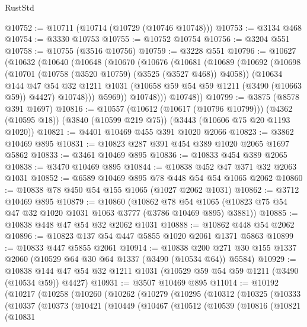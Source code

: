 \begin{lexlean}{RustStd}
\begin{coremodule}
@10752 := @10711 (@10714 (@10729 (@10746 @10748)))
@10753 := @3134 @468
@10754 := @3330 @10753
@10755 := @10752 @10754
@10756 := @3204 @551
@10758 := @10755 (@3516 @10756)
@10759 := @3228 @551
@10796 := @10627
    (@10632
      (@10640
        (@10648
          (@10670
            (@10676
              (@10681
                (@10689
                  (@10692
                    (@10698
                      (@10701 (@10758 (@3520 @10759) (@3525 (@3527 @468)) @4058))
                      (@10634
                        @144
                        @47
                        @54
                        @32
                        @1211
                        @1031
                        (@10658 @59 @54 @59 @1211 (@3490 (@10663 @59)) @4427)
                        @10748)))
                  @5969))
              @10748)))
        @10748))
@10799 := @3875 (@8578 @391 @1697)
@10816 := @10557
    (@10612 (@10617 (@10796 @10799)))
    (@4362 (@10595 @18))
    (@3840 (@10599 @219 @75))
    (@3443 (@10606 @75 @20 @1193 @1020))
@10821 := @4401 @10469 @455 @391 @1020 @2066
@10823 := @3862 @10469 @895
@10831 := @10823 @287 @391 @454 @389 @1020 @2065 @1697 @5862
@10833 := @3461 @10469 @895
@10836 := @10833 @454 @389 @2065
@10838 := @3470 @10469 @895
@10844 := @10838 @452 @47 @371 @32 @2063 @1031
@10852 := @6589 @10469 @895 @78 @448 @54 @54 @1065 @2062
@10860 := @10838 @78 @450 @54 @155 @1065 (@1027 @2062 @1031)
@10862 := @3712 @10469 @895
@10879 := @10860
    (@10862
      @78
      @54
      @1065
      (@10823 @75 @54 @47 @32 @1020 @1031 @1063 @3777 (@3786 @10469 @895) @3881))
@10885 := @10838 @448 @47 @54 @32 @2062 @1031
@10888 := @10862 @448 @54 @2062
@10896 := @10823 @137 @54 @447 @5855 @1020 @2061 @1371 @5863
@10899 := @10833 @447 @5855 @2061
@10914 := @10838
    @200
    @271
    @30
    @155
    @1337
    @2060
    (@10529 @64 @30 @64 @1337 (@3490 (@10534 @64)) @5584)
@10929 := @10838 @144 @47 @54 @32 @1211 @1031 (@10529 @59 @54 @59 @1211 (@3490 (@10534 @59)) @4427)
@10931 := @3507 @10469 @895
@11014 := @10192
    (@10217
      (@10258
        (@10260
          (@10262
            (@10279
              (@10295
                (@10312
                  (@10325
                    (@10333
                      (@10337
                        (@10373
                          (@10421
                            (@10449
                              (@10467
                                (@10512
                                  (@10539
                                    (@10816
                                      (@10821
                                        (@10831

\end{coremodule}
\end{lexlean}
